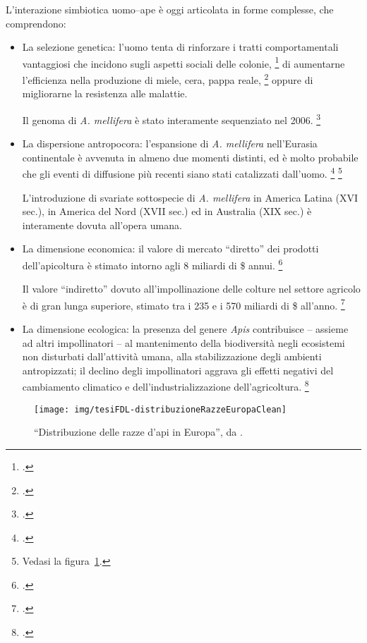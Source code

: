 L'interazione simbiotica uomo--ape è oggi articolata in forme complesse, che comprendono:
\begin{itemize}
    \item La selezione genetica: l'uomo tenta di rinforzare i tratti comportamentali vantaggiosi che incidono sugli aspetti sociali delle colonie, \footcite{behavGenetics}
    di aumentarne l'efficienza nella produzione di miele, cera, pappa reale, \footcite{algerianHoney}
    oppure di migliorarne la resistenza alle malattie.

    Il genoma di \emph{A. mellifera} è stato interamente sequenziato nel 2006. \footcite{genomeSeq}
    \item La dispersione antropocora: l'espansione di \emph{A. mellifera} nell'Eurasia continentale è avvenuta in almeno due momenti distinti, ed è molto probabile che gli eventi di diffusione più recenti siano stati catalizzati dall'uomo.
    \footcite{antropocora}
    \footnote{Vedasi la figura~\ref{img:europ}.}

        L'introduzione di svariate sottospecie di \emph{A. mellifera} in America Latina (XVI sec.), in America del Nord (XVII sec.) ed in Australia (XIX sec.) è interamente dovuta all'opera umana.
    \item La dimensione economica: il valore di mercato ``diretto'' dei prodotti dell'apicoltura è stimato intorno agli 8 miliardi di \$ annui. \footcite{honeymarket1}

        Il valore ``indiretto'' dovuto all'impollinazione delle colture nel settore agricolo è di gran lunga superiore, stimato tra i 235 e i 570 miliardi di \$ all'anno. \footcite{honeymarket2,honeymarket3}
    \item La dimensione ecologica: la presenza del genere \emph{Apis} contribuisce -- assieme ad altri impollinatori -- al mantenimento della biodiversità negli ecosistemi non disturbati dall'attività umana, alla stabilizzazione degli ambienti antropizzati; il declino degli impollinatori aggrava gli effetti negativi del cambiamento climatico e dell'industrializzazione dell'agricoltura. \footcite{decline}
\end{itemize}

\begin{figure}
    \centering
    \texttt{[image: img/tesiFDL-distribuzioneRazzeEuropaClean]}

    \caption[Distribuzione delle razze d'api in Europa]{``Distribuzione
    delle razze d'api in Europa'', da \cite[24]{tesiFDL}.}
    \label{img:europ}
\end{figure}

